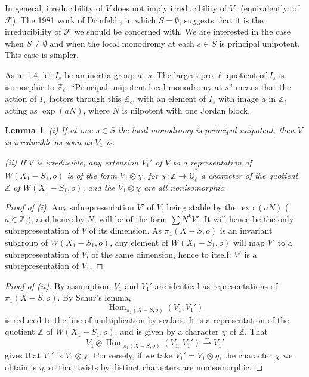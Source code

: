 \documentclass[11pt,a4paper]{article}
\theoremstyle{plain}
\newtheorem{lemma}[theorem]{Lemma}
\theoremstyle{definition}
\DeclareMathOperator{\Hom}{Hom}
\newcommand{\Ql}{\overline{\mathbb{Q}}_\ell}
\newcommand{\Z}{\mathbb{Z}}
\begin{document}
In general, irreducibility of $V$ does not imply irreducibility of $V_1$ (equivalently: of $\mathcal{F}$). The 1981 work of Drinfeld \cite{D}, in which $S = \emptyset$, suggests that it is the irreducibility of $\mathcal{F}$ we should be concerned with. We are interested in the case when $S \neq \emptyset$ and when the local monodromy at each $s \in S$ is principal unipotent. This case is simpler.

As in 1.4, let $I_s$ be an inertia group at $s$. The largest pro-$\ell$ quotient of $I_s$ is isomorphic to $\Z_\ell$. ``Principal unipotent local monodromy at $s$'' means that the action of $I_s$ factors through this $\Z_\ell$, with an element of $I_s$ with image $a$ in $\Z_\ell$ acting as $\exp(aN)$, where $N$ is nilpotent with one Jordan block.

\begin{lemma}\label{lem:irred}
\emph{(i)} If at one $s \in S$ the local monodromy is principal unipotent, then $V$ is irreducible as soon as $V_1$ is.

\emph{(ii)} If $V$ is irreducible, any extension $V_1'$ of $V$ to a representation of $W(X_1 - S_1, o)$ is of the form $V_1 \otimes \chi$, for $\chi: \Z \to \Ql^*$ a character of the quotient $\Z$ of $W(X_1 - S_1, o)$, and the $V_1 \otimes \chi$ are all nonisomorphic.
\end{lemma}

\begin{proof}[Proof of (i)]
Any subrepresentation $V'$ of $V$, being stable by the $\exp(aN)$ ($a \in \Z_\ell$), and hence by $N$, will be of the form $\sum N^k V'$. It will hence be the only subrepresentation of $V$ of its dimension. As $\pi_1(X - S, o)$ is an invariant subgroup of $W(X_1 - S_1, o)$, any element of $W(X_1 - S_1, o)$ will map $V'$ to a subrepresentation of $V$, of the same dimension, hence to itself: $V'$ is a subrepresentation of $V_1$.
\end{proof}

\begin{proof}[Proof of (ii)]
By assumption, $V_1$ and $V_1'$ are identical as representations of $\pi_1(X - S, o)$. By Schur's lemma,
\[
\Hom_{\pi_1(X - S, o)}(V_1, V_1')
\]
is reduced to the line of multiplication by scalars. It is a representation of the quotient $\Z$ of $W(X_1 - S_1, o)$, and is given by a character $\chi$ of $\Z$. That
\[
V_1 \otimes \Hom_{\pi_1(X - S, o)}(V_1, V_1') \xrightarrow{\sim} V_1'
\]
gives that $V_1'$ is $V_1 \otimes \chi$. Conversely, if we take $V_1' = V_1 \otimes \eta$, the character $\chi$ we obtain is $\eta$, so that twists by distinct characters are nonisomorphic.
\end{proof}
\end{document}
